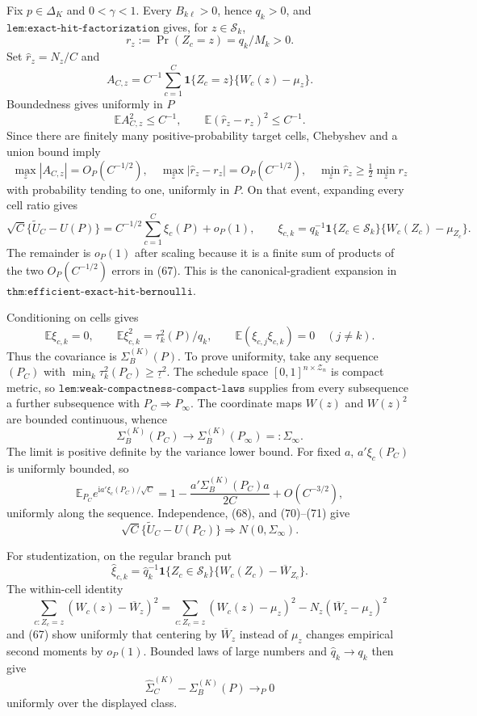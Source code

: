 Fix \(p\in\Delta_K\) and \(0<\gamma<1\).  Every \(B_{k\ell}>0\), hence \(q_k>0\), and \(\texttt{lem:exact-hit-factorization}\) gives, for \(z\in\mathcal S_k\),
\[
r_z:=\Pr(Z_c=z)=q_k/M_k>0. \tag{66}
\]
Set \(\widehat r_z=N_z/C\) and
\[
A_{C,z}=C^{-1}\sum_{c=1}^C\mathbf1\{Z_c=z\}\{W_c(z)-\mu_z\}.
\]
Boundedness gives uniformly in \(P\)
\[
\mathbb EA_{C,z}^2\leq C^{-1},\qquad
\mathbb E(\widehat r_z-r_z)^2\leq C^{-1}. \tag{67}
\]
Since there are finitely many positive-probability target cells, Chebyshev and a union bound imply
\[
\max_z|A_{C,z}|=O_P(C^{-1/2}),\quad
\max_z|\widehat r_z-r_z|=O_P(C^{-1/2}),\quad
\min_z\widehat r_z\geq\tfrac12\min_zr_z
\]
with probability tending to one, uniformly in \(P\).  On that event, expanding every cell ratio gives
\[
\sqrt C\{\widetilde U_C-U(P)\}
=C^{-1/2}\sum_{c=1}^C\xi_c(P)+o_P(1),\qquad
\xi_{c,k}=q_k^{-1}\mathbf1\{Z_c\in\mathcal S_k\}
\{W_c(Z_c)-\mu_{Z_c}\}. \tag{68}
\]
The remainder is \(o_P(1)\) after scaling because it is a finite sum of products of the two \(O_P(C^{-1/2})\) errors in (67).  This is the canonical-gradient expansion in \(\texttt{thm:efficient-exact-hit-bernoulli}\).

Conditioning on cells gives
\[
\mathbb E\xi_{c,k}=0,\qquad
\mathbb E\xi_{c,k}^2=\tau_k^2(P)/q_k,\qquad
\mathbb E(\xi_{c,j}\xi_{c,k})=0\quad(j\ne k). \tag{69}
\]
Thus the covariance is \(\Sigma_B^{(K)}(P)\).  To prove uniformity, take any sequence \((P_C)\) with \(\min_k\tau_k^2(P_C)\geq\underline\tau^2\).  The schedule space \([0,1]^{n\times\mathcal Z_n}\) is compact metric, so \(\texttt{lem:weak-compactness-compact-laws}\) supplies from every subsequence a further subsequence with \(P_C\Rightarrow P_\infty\).  The coordinate maps \(W(z)\) and \(W(z)^2\) are bounded continuous, whence
\[
\Sigma_B^{(K)}(P_C)\longrightarrow\Sigma_B^{(K)}(P_\infty)=:\Sigma_\infty. \tag{70}
\]
The limit is positive definite by the variance lower bound.  For fixed \(a\), \(a'\xi_c(P_C)\) is uniformly bounded, so
\[
\mathbb E_{P_C}e^{\mathrm ia'\xi_c(P_C)/\sqrt C}
=1-\frac{a'\Sigma_B^{(K)}(P_C)a}{2C}+O(C^{-3/2}), \tag{71}
\]
uniformly along the sequence.  Independence, (68), and (70)--(71) give
\[
\sqrt C\{\widetilde U_C-U(P_C)\}\Rightarrow N(0,\Sigma_\infty). \tag{72}
\]

For studentization, on the regular branch put
\[
\widehat\xi_{c,k}=\widehat q_k^{-1}\mathbf1\{Z_c\in\mathcal S_k\}
\{W_c(Z_c)-\overline W_{Z_c}\}.
\]
The within-cell identity
\[
\sum_{c:Z_c=z}(W_c(z)-\overline W_z)^2
=\sum_{c:Z_c=z}(W_c(z)-\mu_z)^2-N_z(\overline W_z-\mu_z)^2
\]
and (67) show uniformly that centering by \(\overline W_z\) instead of \(\mu_z\) changes empirical second moments by \(o_P(1)\).  Bounded laws of large numbers and \(\widehat q_k\to q_k\) then give
\[
\widehat\Sigma_C^{(K)}-\Sigma_B^{(K)}(P)\to_P0 \tag{73}
\]
uniformly over the displayed class.

